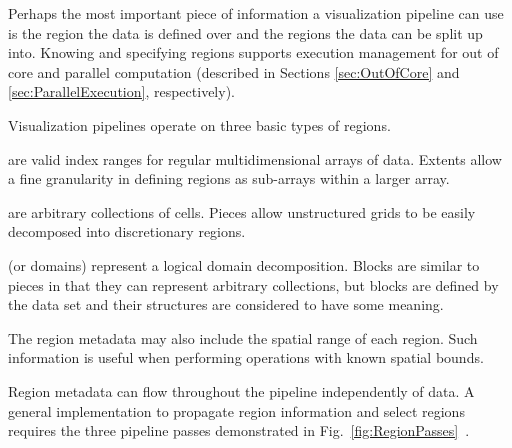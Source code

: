 \documentclass[journal,onecolumn,12pt,letterpaper,twoside]{IEEEtran}
\newcommand*{\lcite}[1]{~\cite{#1}}
\newcommand*{\figref}[1]{Fig.~\ref{#1}}
\begin{document}
Perhaps the most important piece of information a visualization pipeline
can use is the region the data is defined over and the regions the data can
be split up into.  Knowing and specifying regions supports execution
management for out of core and parallel computation (described in Sections
\ref{sec:OutOfCore} and \ref{sec:ParallelExecution}, respectively).

Visualization pipelines operate on three basic types of regions.
\begin{description}
\item[Extents] are valid index ranges for regular multidimensional arrays
  of data.  Extents allow a fine granularity in defining regions as
  sub-arrays within a larger array.
\item[Pieces] are arbitrary collections of cells.  Pieces allow
  unstructured grids to be easily decomposed into discretionary regions.
\item[Blocks] (or domains) represent a logical domain decomposition.
  Blocks are similar to pieces in that they can represent arbitrary
  collections, but blocks are defined by the data set and their structures
  are considered to have some meaning.
\end{description}
The region metadata may also include the spatial range of each region.
Such information is useful when performing operations with known spatial
bounds.

Region metadata can flow throughout the pipeline independently of data.  A
general implementation to propagate region information and select regions
requires the three pipeline passes demonstrated in
\figref{fig:RegionPasses}\lcite{Ahrens2001}.
\end{document}
